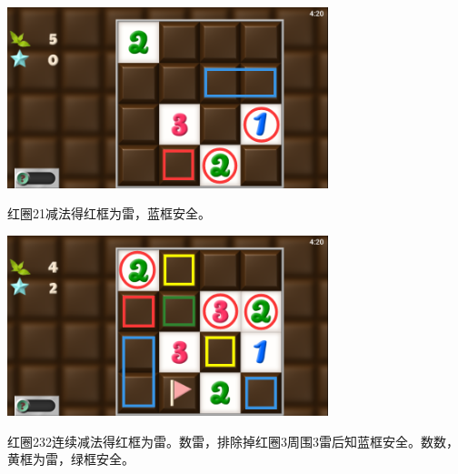 \subsection{} %
\begin{center}
    \includegraphics[width=0.7\textwidth]{puzzle/94-1.png}
\end{center}
红圈21减法得红框为雷，蓝框安全。
\begin{center}
    \includegraphics[width=0.7\textwidth]{puzzle/94-2.png}
\end{center}
红圈232连续减法得红框为雷。数雷，排除掉红圈3周围3雷后知蓝框安全。数数，黄框为雷，绿框安全。

